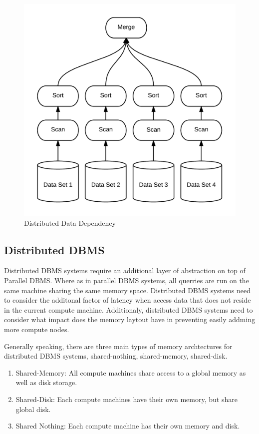 \documentclass[10pt,twocolumn]{IEEEtran11}
\begin{document}
\begin{figure}[h]
\centering
\includegraphics[scale=0.12]{images/parDBMS.png}
\caption{Distributed Data Dependency}
\label{fig:disDBMS}
\end{figure}

\subsection{Distributed DBMS}

Distributed DBMS systems require an additional layer of abstraction on top of Parallel DBMS.  Where as in parallel DBMS systems, all querries are run on the same machine sharing the same memory space.  Distributed DBMS systems need to consider the additonal factor of latency when access data that does not reside in the current compute machine.  Additionaly, distributed DBMS systems need to consider what impact does the memory laytout have in preventing easily addming more compute nodes.  

Generally speaking, there are three main types of memory 
archtectures for distributed DBMS systems, shared-nothing, shared-memory, shared-disk.

\begin{enumerate}
\item Shared-Memory: All compute machines share access to a global memory as well as disk storage.  
\item Shared-Disk: Each compute machines have their own memory, but share global disk.
\item Shared Nothing: Each compute machine has their own memory and disk. 
\end{enumerate}
\end{document}
